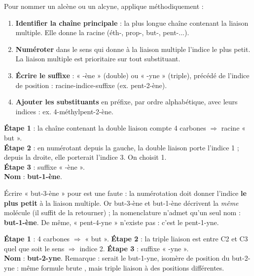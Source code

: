 \documentclass[11pt]{article}
\newcounter{popsec}
\newcounter{popsub}
\newcommand{\courssub}[1]{%
  \stepcounter{popsub}%
  \par\vspace{9pt}\noindent{\popxbold\fontsize{11.5}{13}\selectfont\color{popink}{\color{poporange}\thepopsec.\thepopsub}\hspace{6pt}#1}\par\nopagebreak\vspace{4pt}
}
\begin{document}
\begin{methode}
Pour nommer un alcène ou un alcyne, applique méthodiquement :
\begin{enumerate}
\item \textbf{Identifier la chaîne principale} : la plus longue chaîne contenant la liaison multiple. Elle donne la racine (éth-, prop-, but-, pent-...).
\item \textbf{Numéroter} dans le sens qui donne à la liaison multiple l'indice le plus petit. La liaison multiple est prioritaire sur tout substituant.
\item \textbf{Écrire le suffixe} : « -ène » (double) ou « -yne » (triple), précédé de l'indice de position : racine-indice-suffixe (ex. pent-2-ène).
\item \textbf{Ajouter les substituants} en préfixe, par ordre alphabétique, avec leurs indices : ex. 4-méthylpent-2-ène.
\end{enumerate}
\end{methode}

\courssub{Premiers exemples progressifs}

\begin{exemplebox}[Exemple 1 : \ce{CH2=CH-CH2-CH3}]
\textbf{Étape 1} : la chaîne contenant la double liaison compte 4 carbones $\Rightarrow$ racine « but ».\\
\textbf{Étape 2} : en numérotant depuis la gauche, la double liaison porte l'indice 1 ; depuis la droite, elle porterait l'indice 3. On choisit 1.\\
\textbf{Étape 3} : suffixe « -ène ».\\
\textbf{Nom} : \textbf{but-1-ène}.
\end{exemplebox}

\begin{attention}
Écrire « but-3-ène » pour  est une faute : la numérotation doit donner l'indice \textbf{le plus petit} à la liaison multiple. Or but-3-ène et but-1-ène décrivent la \emph{même} molécule (il suffit de la retourner) ; la nomenclature n'admet qu'un seul nom : \textbf{but-1-ène}. De même, « pent-4-yne » n'existe pas : c'est le pent-1-yne.
\end{attention}

\begin{exemplebox}[Exemple 2 : \ce{CH3-C##C-CH3}]
\textbf{Étape 1} : 4 carbones $\Rightarrow$ « but ». \textbf{Étape 2} : la triple liaison est entre C2 et C3 quel que soit le sens $\Rightarrow$ indice 2. \textbf{Étape 3} : suffixe « -yne ».\\
\textbf{Nom} : \textbf{but-2-yne}. Remarque :  serait le but-1-yne, isomère de position du but-2-yne : même formule brute , mais triple liaison à des positions différentes.
\end{exemplebox}
\end{document}
